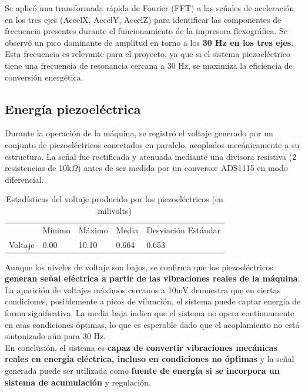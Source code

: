 \documentclass{article}
\begin{document}
Se aplicó una transformada rápida de Fourier (FFT) a las señales de aceleración en los tres ejes (AccelX, AccelY, AccelZ) para identificar las componentes de frecuencia presentes durante el funcionamiento de la impresora flexográfica. Se observó un pico dominante de amplitud en torno a los \textbf{30 Hz en los tres ejes}.
Esta frecuencia es relevante para el proyecto, ya que si el sistema piezoeléctrico tiene una frecuencia de resonancia cercana a 30 Hz, se maximiza la eficiencia de conversión energética.
\subsection{Energía piezoeléctrica}
Durante la operación de la máquina, se registró el voltaje generado por un conjunto de piezoeléctricos conectados en paralelo, acoplados mecánicamente a su estructura. La señal fue rectificada y atenuada mediante una divisora resistiva (2 resistencias de 10k$\Omega$) antes de ser medida por un conversor ADS1115 en modo diferencial.
\begin{table}[H]
\centering
\begin{tabular}{lllll}
       & Mínimo & Máximo & Media & Desviación Estándar \\
Voltaje & 0.00 & 10.10  & 0.664 & 0.653               
\end{tabular}
\caption{Estadísticas del voltaje producido por los piezoeléctricos (en milivolts)}
\end{table}
Aunque los niveles de voltaje son bajos, se confirma que los piezoeléctricos \textbf{generan señal eléctrica a partir de las vibraciones reales de la máquina}. La aparición de voltajes máximos cercanos a 10mV demuestra que en ciertas condiciones, posiblemente a picos de vibración, el sistema puede captar energía de forma significativa.
La media baja indica que el sistema no opera continuamente en esas condiciones óptimas, lo que es esperable dado que el acoplamiento no está sintonizado aún para 30 Hz.\\
En conclusión, el sistema es \textbf{capaz de convertir vibraciones mecánicas reales en energía eléctrica, incluso en condiciones no óptimas} y la señal generada puede ser utilizada como \textbf{fuente de energía si se incorpora un sistema de acumulación} y regulación.
\newpage
\end{document}
